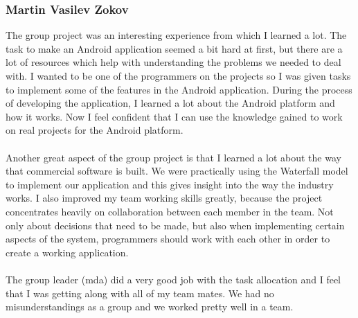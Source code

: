 \documentclass[12pt]{article}
\begin{document}
\subsubsection{Martin Vasilev Zokov}
The group project was an interesting experience from which I learned a lot. The task to make an Android application seemed a bit hard at first, but there are a lot of resources which help with understanding the problems we needed to deal with. I wanted to be one of the programmers on the projects so I was given tasks to implement some of the features in the Android application. During the process of developing the application, I learned a lot about the Android platform and how it works. Now I feel confident that I can use the knowledge gained to work on real projects for the Android platform.
~\\\\ 
Another great aspect of the group project is that I learned a lot about the way that commercial software is built. We were practically using the Waterfall model to implement our application and this gives insight into the way the industry works. I also improved my team working skills greatly, because the project concentrates heavily on collaboration between each member in the team. Not only about decisions that need to be made, but also when implementing certain aspects of the system, programmers should work with each other in order to create a working application.
~\\\\ 
The group leader (mda) did a very good job with the task allocation and I feel that I was getting along with all of my team mates. We had no misunderstandings as a group and we worked pretty well in a team.
\end{document}
